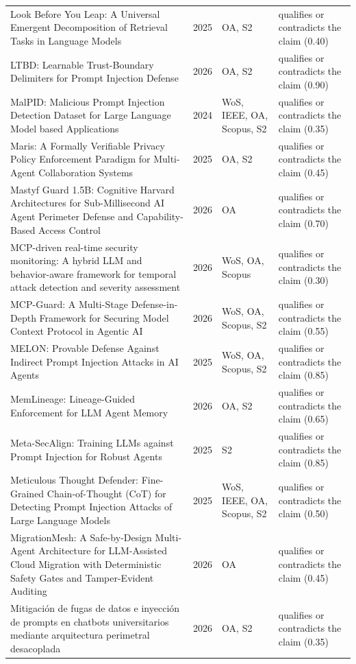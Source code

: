 \begin{longtable}{@{}%
  >{\raggedright\arraybackslash}p{}c%
  >{\raggedright\arraybackslash}p{}%
  >{\raggedright\arraybackslash}p{}@{}}
Look Before You Leap: A Universal Emergent Decomposition of Retrieval Tasks in Language Models & 2025 & OA, S2 & qualifies or contradicts the claim (0.40) \\
LTBD: Learnable Trust-Boundary Delimiters for Prompt Injection Defense & 2026 & OA, S2 & qualifies or contradicts the claim (0.90) \\
MalPID: Malicious Prompt Injection Detection Dataset for Large Language Model based Applications & 2024 & WoS, IEEE, OA, Scopus, S2 & qualifies or contradicts the claim (0.35) \\
Maris: A Formally Verifiable Privacy Policy Enforcement Paradigm for Multi-Agent Collaboration Systems & 2025 & OA, S2 & qualifies or contradicts the claim (0.45) \\
Mastyf Guard 1.5B: Cognitive Harvard Architectures for Sub-Millisecond AI Agent Perimeter Defense and Capability-Based Access Control & 2026 & OA & qualifies or contradicts the claim (0.70) \\
MCP-driven real-time security monitoring: A hybrid LLM and behavior-aware framework for temporal attack detection and severity assessment & 2026 & WoS, OA, Scopus & qualifies or contradicts the claim (0.30) \\
MCP-Guard: A Multi-Stage Defense-in-Depth Framework for Securing Model Context Protocol in Agentic AI & 2026 & WoS, OA, Scopus, S2 & qualifies or contradicts the claim (0.55) \\
MELON: Provable Defense Against Indirect Prompt Injection Attacks in AI Agents & 2025 & WoS, OA, Scopus, S2 & qualifies or contradicts the claim (0.85) \\
MemLineage: Lineage-Guided Enforcement for LLM Agent Memory & 2026 & OA, S2 & qualifies or contradicts the claim (0.65) \\
Meta-SecAlign: Training LLMs against Prompt Injection for Robust Agents & 2025 & S2 & qualifies or contradicts the claim (0.85) \\
Meticulous Thought Defender: Fine-Grained Chain-of-Thought (CoT) for Detecting Prompt Injection Attacks of Large Language Models & 2025 & WoS, IEEE, OA, Scopus, S2 & qualifies or contradicts the claim (0.50) \\
MigrationMesh: A Safe-by-Design Multi-Agent Architecture for LLM-Assisted Cloud Migration with Deterministic Safety Gates and Tamper-Evident Auditing & 2026 & OA & qualifies or contradicts the claim (0.45) \\
Mitigación de fugas de datos e inyección de prompts en chatbots universitarios mediante arquitectura perimetral desacoplada & 2026 & OA, S2 & qualifies or contradicts the claim (0.35) \\

\end{longtable}
